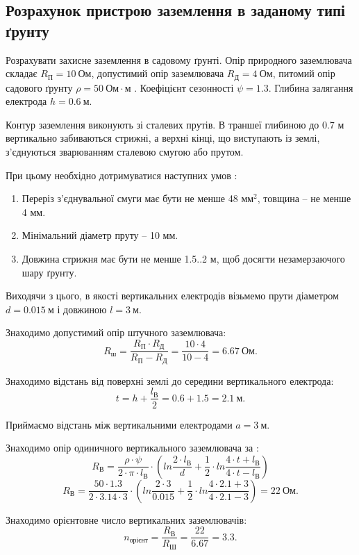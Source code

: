 \documentclass[a4paper,12pt]{article}
\begin{document}
\subsection{Розрахунок пристрою заземлення в заданому типі ґрунту}
Розрахувати захисне заземлення в садовому ґрунті. Опір природного заземлювача складає $R_\text{П}=10\ \text{Ом}$, допустимий опір заземлювача $R_\text{Д}=4\ \text{Ом}$, питомий опір садового ґрунту $\rho=50\ \text{Ом}\cdot\text{м}$ \cite{burakova}. Коефіцієнт сезонності $\psi = 1.3$. Глибина залягання електрода $h = 0.6\ \text{м}$.

Контур заземлення виконують зі сталевих прутів. В траншеї глибиною до 0.7 м вертикально забиваються стрижні, а верхні кінці, що виступають із землі, з’єднуються зварюванням сталевою смугою або прутом.

При цьому необхідно дотримуватися наступних умов \cite{dzunzuk}:
\begin{enumerate}
\item Переріз з’єднувальної смуги має бути не менше 48 $\text{мм}^2$, товщина -- не менше 4 мм.
\item Мінімальний діаметр пруту -- 10 мм.
\item Довжина стрижня має бути не менше 1.5..2 м, щоб досягти незамерзаючого шару ґрунту.
\end{enumerate}

Виходячи з цього, в якості вертикальних електродів візьмемо прути діаметром $d = 0.015\ \text{м}$ і довжиною $l = 3\ \text{м}$.

Знаходимо допустимий опір штучного заземлювача:
\[
R_\text{ш} = \frac{R_\text{П} \cdot R_\text{Д}}{R_\text{П} - R_\text{Д}} = 
\frac{10 \cdot 4}{10 - 4} = 6.67\ \text{Ом}.
\]

Знаходимо відстань від поверхні землі до середини вертикального електрода:
\[
t = h + \frac{l_\text{В}}{2} = 0.6 + 1.5 = 2.1\ \text{м}.
\]

Приймаємо відстань між вертикальними електродами $a = 3\ \text{м}$.

Знаходимо опір одиничного вертикального заземлювача за \cite{dzunzuk}:
\[
R_\text{В} = \frac{\rho\cdot\psi}{2\cdot\pi\cdot l_\text{В}} \cdot \left( ln \frac{2\cdot l_\text{В}}{d} + \frac{1}{2}\cdot ln \frac{4 \cdot t + l_\text{В}}{4 \cdot t - l_\text{В}} \right)
\]
\[
R_\text{В} = \frac{50\cdot1.3}{2\cdot3.14\cdot 3} \cdot \left( ln \frac{2\cdot 3}{0.015} + \frac{1}{2}\cdot ln \frac{4 \cdot 2.1 + 3}{4 \cdot 2.1 - 3} \right) = 22\ \text{Ом}.
\]

Знаходимо орієнтовне число вертикальних заземлювачів:
\[
n_\text{орієнт} = \frac{R_\text{В}}{R_\text{Ш}} = \frac{22}{6.67} = 3.3.
\]
\end{document}
